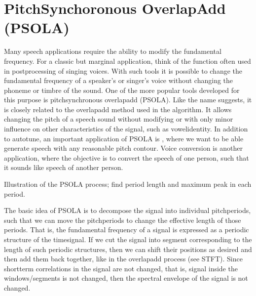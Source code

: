 \documentclass[letterpaper,10pt,english]{jupyterBook}
\begin{document}
\sphinxstepscope


\section{Pitch\sphinxhyphen{}Synchoronous Overlap\sphinxhyphen{}Add (PSOLA)}
\label{\detokenize{Representations/Pitch-Synchoronous_Overlap-Add_PSOLA:pitch-synchoronous-overlap-add-psola}}\label{\detokenize{Representations/Pitch-Synchoronous_Overlap-Add_PSOLA::doc}}
\sphinxAtStartPar
Many speech applications require the ability to modify the fundamental
frequency. For a classic but marginal application, think of the
 function often used
in post\sphinxhyphen{}processing of singing voices. With such tools it is possible to
change the fundamental frequency of a speaker’s or singer’s voice
without changing the phoneme or timbre of the sound. One of the more
popular tools developed for this purpose is pitch\sphinxhyphen{}synchronous
overlap\sphinxhyphen{}add (PSOLA). Like the name suggests, it is closely related to
the overlap\sphinxhyphen{}add method used in the {\hyperref[\detokenize{Representations/Spectrogram_and_the_STFT::doc}]{}} algorithm. It allows changing the
pitch of a speech sound without modifying or with only minor influence
on other characteristics of the signal, such as vowel\sphinxhyphen{}identity. In
addition to auto\sphinxhyphen{}tune, an important application of PSOLA is , where we
want to be able generate speech with any reasonable pitch contour. Voice
conversion is another application, where the objective is to convert the
speech of one person, such that it sounds like speech of another person.

\sphinxAtStartPar
Illustration of the PSOLA process; find period length and maximum peak
in each period.

\sphinxAtStartPar
{}

\sphinxAtStartPar
The basic idea of PSOLA is to decompose the signal into individual
pitch\sphinxhyphen{}periods, such that we can move the pitch\sphinxhyphen{}periods to change the
effective length of those periods. That is, the fundamental frequency of
a signal is expressed as a periodic structure of the time\sphinxhyphen{}signal. If we
cut the signal into segment corresponding to the length of such periodic
structures, then we can shift their positions as desired and then add
them back together, like in the overlap\sphinxhyphen{}add process (see STFT). Since
short\sphinxhyphen{}term correlations in the signal are not changed, that is, signal
inside the windows/segments is not changed, then the spectral envelope
of the signal is not changed.
\end{document}
